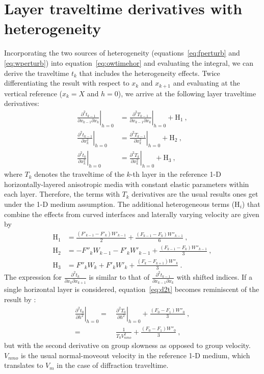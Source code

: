 \section{Layer traveltime derivatives with heterogeneity}
Incorporating the two sources of heterogeneity (equations~\ref{eq:fperturb} and \ref{eq:wperturb}) into equation~\ref{eq:owtimehor} and evaluating the integral, we can derive the traveltime $t_k$ that includes the heterogeneity effects. Twice differentiating the result with respect to $x_k$ and $x_{k+1}$ and evaluating at the vertical reference ($x_k = X$ and $h=0$), we arrive at the following layer traveltime derivatives:
\begin{align}
\label{eq:dthet}
\left.\frac{\partial^2 t_{k-1}}{\partial x_{k-1} \partial x_{k}}\right\rvert_{h=0} & =   \left.\frac{\partial^2 T_{k-1}}{\partial x_{k-1} \partial x_{k}}\right\rvert_{h=0} + \mbox{H}_1 ~,\\
\nonumber
\left.\frac{\partial^2 t_{k-1}}{\partial x_{k}^2}\right\rvert_{h=0} & = \left.\frac{\partial^2 T_{k-1}}{\partial x_{k}^2}\right\rvert_{h=0} + \mbox{H}_2  ~,\\
\nonumber
\left.\frac{\partial^2 t_{k}}{\partial x^2_{k}}\right\rvert_{h=0} & =  \left.\frac{\partial^2 T_{k}}{\partial x^2_{k}}\right\rvert_{h=0} +  \mbox{H}_3  ~,
\end{align}
where $T_k$ denotes the traveltime of the $k$-th layer in the reference 1-D horizontally-layered anisotropic media with constant elastic parameters within each layer. Therefore, the terms with $T_k$ derivatives are the usual results ones get under the 1-D medium assumption. The additional heterogeneous terms (H$_i$) that combine the effects from curved interfaces and laterally varying velocity are given by
\begin{align}
 \mbox{H}_1 & =  \frac{(F'_{k-1} - F'_{k})W'_{k-1} }{2} + \frac{(F_{k-1} - F_{k})W''_{k-1} }{6} ~,\\
\nonumber
 \mbox{H}_2 & =  - F''_{k} W_{k-1}  - F'_{k}W'_{k-1} + \frac{(F_{k-1} - F_{k})W''_{k-1} }{3}  ~,\\
\nonumber
 \mbox{H}_3 & =   F''_{k} W_{k} + F'_{k}W'_{k} + \frac{(F_{k} - F_{k+1}) W''_{k} }{3}  ~.
\end{align}
The expression for $\frac{\partial^2 t_{k}}{\partial x_{k} \partial x_{k+1}}$ is similar to that of $\frac{\partial^2 t_{k-1}}{\partial x_{k-1} \partial x_{k}}$ with shifted indices. If a single horizontal layer is considered, equation~\ref{eq:d2t} becomes reminiscent of the result by \cite{grechkatsvankinlatvar}:
\begin{align}
\nonumber
\left.\frac{\partial^2 t_0}{\partial h^2}\right\rvert_{h=0} = &~\left.\frac{\partial^2 T_0}{\partial h^2}\right\rvert_{h=0} + \frac{(F_{0} - F_{1})W''_{0}}{3}~, \\
\label{eq:onelayer}
= &~ \frac{1}{T_0 V^2_{nmo}} + \frac{(F_{0} - F_{1})W''_{0}}{3}~,
\end{align}
but with the second derivative on group slowness as opposed to group velocity. $V_{nmo}$ is the usual normal-moveout velocity in the reference 1-D medium, which translates to $V_m$ in the case of diffraction traveltime.

